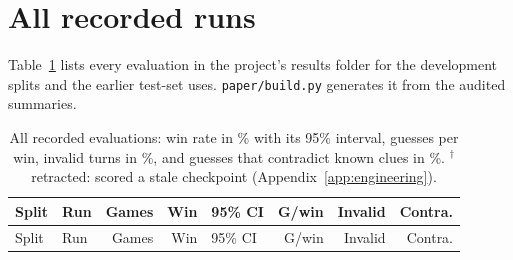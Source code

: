 \documentclass{article}
\begin{document}
\clearpage
\section{All recorded runs}
Table~\ref{tab:all} lists every evaluation in the project's results folder for the development splits and the earlier test-set uses. \texttt{paper/build.py} generates it from the audited summaries.

{\scriptsize
\begin{longtable}{llrrlrrr}
\caption{All recorded evaluations: win rate in \% with its 95\% interval, guesses per win, invalid turns in \%, and guesses that contradict known clues in \%. $^\dagger$ retracted: scored a stale checkpoint (Appendix~\ref{app:engineering}).}\label{tab:all}\\
\toprule
Split & Run & Games & Win & 95\% CI & G/win & Invalid & Contra. \\
\midrule
\endfirsthead
\toprule
Split & Run & Games & Win & 95\% CI & G/win & Invalid & Contra. \\
\midrule
\endhead

\end{longtable}
}
\end{document}
